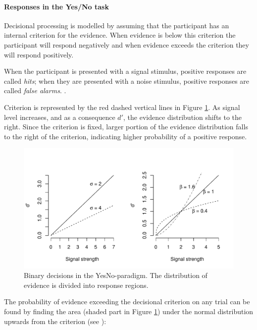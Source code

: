 \documentclass{article}\usepackage{knitr}
\begin{document}
\paragraph{Responses in the Yes/No task}

Decisional processing is modelled by assuming that the participant has an internal criterion for the evidence. When evidence is below this criterion the participant will respond negatively and when evidence exceeds the criterion they will respond  positively.

When the participant is presented with a signal stimulus, positive responses are called \textit{hits}; when they  are presented with a noise stimulus, positive responses are called \textit{false alarms}. \citep{wickens2002, kingdomprins2010}. 

Criterion is represented by the red dashed vertical lines in Figure \ref{fig:yesno}. As signal level increases, and as a consequence $d'$, the evidence distribution shifts to the right. Since the criterion is fixed, larger portion of the evidence distribution falls to the right of the criterion, indicating higher probability of a positive response.

\begin{figure}[!htb]
\centering
\begin{knitrout}
\color{fgcolor}
\includegraphics[width=\maxwidth]{figure/unnamed-chunk-4-1} 

\end{knitrout}
\caption{Binary decisions in the YesNo-paradigm. The distribution of evidence is divided into response regions.}
\label{fig:yesno}
\end{figure}

The probability of evidence exceeding the decisional criterion on any trial can be found by finding the area (shaded part in Figure \ref{fig:yesno}) under the normal distribution upwards from the criterion (see \citet{wickens2002, kingdomprins2010}):
\end{document}

